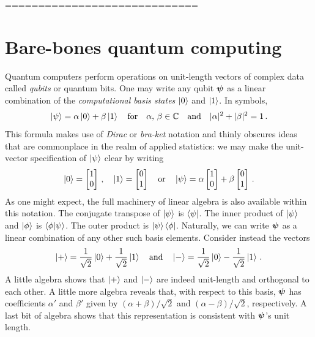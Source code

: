 \documentclass[12pt]{article} %
\begin{document}
=============================




\section{Bare-bones quantum computing}

Quantum computers perform operations on unit-length vectors of complex data called \emph{qubits} or quantum bits.  One may write any qubit $\boldsymbol{\psi}$ as a linear combination of the \emph{computational basis states} $\ket{0}$ and $\ket{1}$.  In symbols,
\begin{align*}
\ket{\psi} = \alpha \ket{0} + \beta \ket{1} \quad \mbox{for} \quad \alpha, \, \beta \in \mathbb{C} \quad \mbox{and} \quad  |\alpha|^2 + |\beta|^2 = 1\, .
\end{align*}
This formula makes use of \emph{Dirac} or \emph{bra-ket} notation and thinly obscures ideas that are commonplace in the realm of applied statistics: we may make the unit-vector specification of $\ket{\psi}$ clear by writing
\begin{align*}
\ket{0}=\begin{bmatrix}
1 \\ 0
\end{bmatrix} \, ,  \quad \ket{1}=\begin{bmatrix}
0 \\ 1
\end{bmatrix} \quad \mbox{or} \quad \ket{\psi} = \alpha \begin{bmatrix}
1 \\ 0
\end{bmatrix} + \beta  \begin{bmatrix}
0 \\ 1
\end{bmatrix}\, .
\end{align*} 
As one might expect, the full machinery of linear algebra is also available within this notation. The conjugate transpose of $\ket{\psi}$ is $\bra{\psi}$. The inner product of $\ket{\psi}$ and $\ket{\phi}$ is $\braket{\phi|\psi}$. The outer product is $\ket{\psi}\bra{\phi}$. Naturally, we can write $\boldsymbol{\psi}$ as a linear combination of any other such basis elements. Consider instead the vectors
\begin{align*}
\ket{+} = \frac{1}{\sqrt{2}} \ket{0} + \frac{1}{\sqrt{2}} \ket{1} \quad \mbox{and} \quad \ket{-} = \frac{1}{\sqrt{2}} \ket{0} - \frac{1}{\sqrt{2}} \ket{1} \, .
\end{align*}
A little algebra shows that $\ket{+}$ and $\ket{-}$ are indeed unit-length and orthogonal to each other. A little more algebra reveals that, with respect to this basis, $\boldsymbol{\psi}$ has coefficients $\alpha'$ and $\beta'$ given by $(\alpha + \beta)/\sqrt{2}$ and $(\alpha - \beta)/\sqrt{2}$, respectively. A last bit of algebra shows that this representation is consistent with $\boldsymbol{\psi}$'s unit length.
\end{document}
